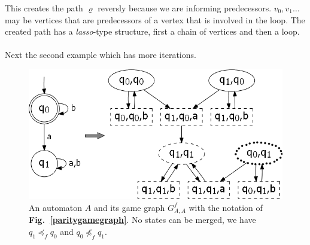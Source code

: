 \documentclass[12pt,oneside,bibliography=totoc,abstracton]{scrartcl}
\newcommand{\figref}[1]{\textbf{Fig.~\ref{#1}}}
\begin{document}
This creates the path $\varrho$ reversly because we are informing predecessors. $v_0, v_1 \ldots$ may be vertices that
are predecessors of a vertex that is involved in the loop.
The created path has a \textit{lasso}-type structure, first a chain of vertices and then a loop.\\\\
Next the second example which has more iterations.
\begin{figure}[ht]
	 \begin{center}
		\includegraphics[scale=0.65]{res/algorithm_secondex}
	\end{center}
	\caption{An automaton $A$ and its game graph $G^f_{A, A}$ with the notation of
		\figref{paritygamegraph}. No states can be merged, we have $q_1 \preceq_f q_0$
		and $q_0 \not\preceq_f q_1$.}
	\label{algorithmsecondex}
\end{figure}
\end{document}
